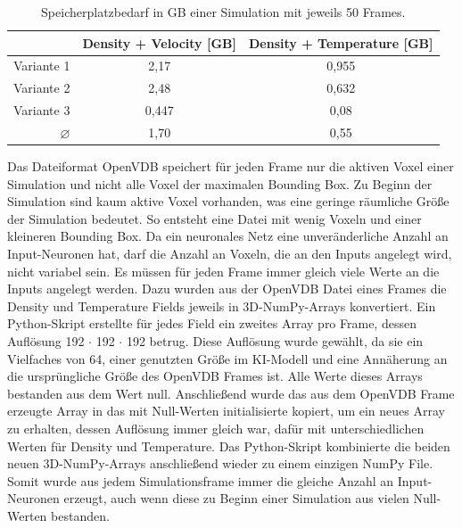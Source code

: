 \begin{table}[ht]
    \centering
    \caption{Speicherplatzbedarf in GB einer Simulation mit jeweils 50 Frames.}
    \begin{tabular}{|r|c|c|}
        \hline
         & Density + Velocity [GB] & Density + Temperature [GB]  \\
         \hline
         Variante 1 & 2,17 & 0,955 \\
         Variante 2 & 2,48 & 0,632 \\         
         Variante 3 & 0,447 & 0,08 \\
         \hline
        \hline
         $\varnothing$  & 1,70 & 0,55 \\
         \hline
    \end{tabular}
    
    \label{tab:veltemp}
\end{table}

Das Dateiformat OpenVDB speichert für jeden Frame nur die aktiven Voxel einer Simulation und nicht alle Voxel der maximalen Bounding Box. Zu Beginn der Simulation sind kaum aktive Voxel vorhanden, was eine geringe räumliche Größe der Simulation bedeutet. So entsteht eine Datei mit wenig Voxeln und einer kleineren Bounding Box. Da ein neuronales Netz eine unveränderliche Anzahl an Input-Neuronen hat, darf die Anzahl an Voxeln, die an den Inputs angelegt wird, nicht variabel sein. Es müssen für jeden Frame immer gleich viele Werte an die Inputs angelegt werden. Dazu wurden aus der OpenVDB Datei eines Frames die Density und Temperature Fields jeweils in 3D-NumPy-Arrays konvertiert. Ein Python-Skript erstellte für jedes Field ein zweites Array pro Frame, dessen Auflösung 192 $\cdot$ 192 $\cdot$ 192 betrug. Diese Auflösung wurde gewählt, da sie ein Vielfaches von 64, einer genutzten Größe im KI-Modell und eine Annäherung an die ursprüngliche Größe des OpenVDB Frames ist. Alle Werte dieses Arrays bestanden aus dem Wert null. Anschließend wurde das aus dem OpenVDB Frame erzeugte Array in das mit Null-Werten initialisierte kopiert, um ein neues Array zu erhalten, dessen Auflösung immer gleich war, dafür mit unterschiedlichen Werten für Density und Temperature. Das Python-Skript kombinierte die beiden neuen 3D-NumPy-Arrays anschließend wieder zu einem einzigen NumPy File. Somit wurde aus jedem Simulationsframe immer die gleiche Anzahl an Input-Neuronen erzeugt, auch wenn diese zu Beginn einer Simulation aus vielen Null-Werten bestanden.


